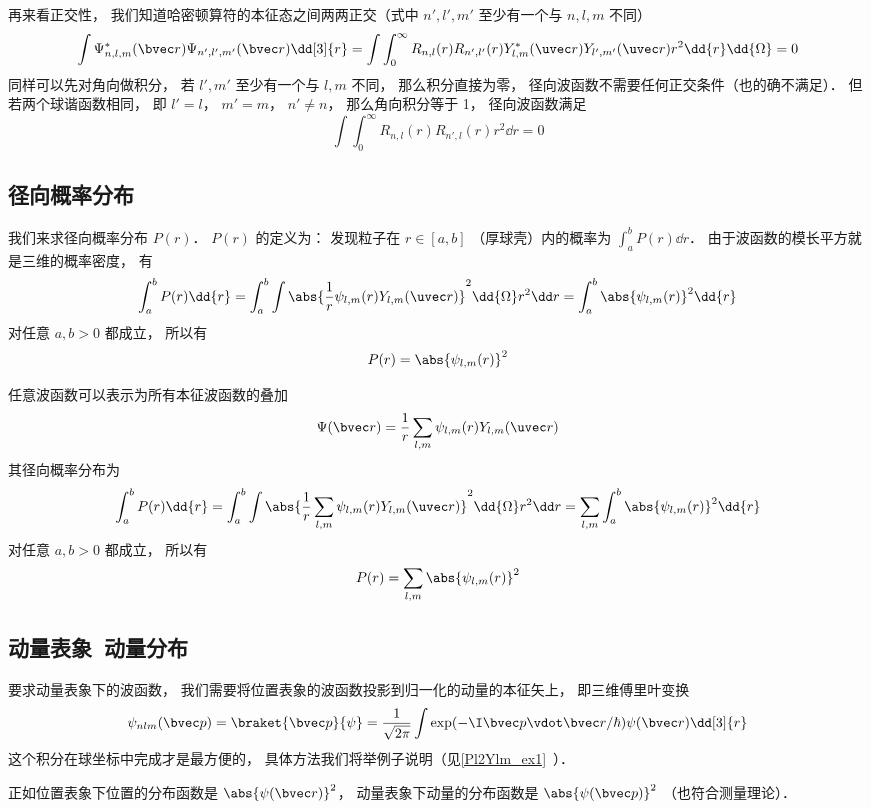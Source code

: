 再来看正交性， 我们知道哈密顿算符的本征态之间两两正交（式中 $n',l',m'$ 至少有一个与 $n, l, m$ 不同）
\begin{equation}
\int \Psi_{n,l,m}^*(\bvec r) \Psi_{n',l',m'}(\bvec r) \dd[3]{r}
= \int \int_0^\infty R_{n,l}(r) R_{n',l'}(r) Y_{l,m}^*(\uvec r)  Y_{l',m'}(\uvec r) r^2 \dd{r}\dd{\Omega} = 0
\end{equation}
同样可以先对角向做积分， 若 $l',m'$ 至少有一个与 $l, m$ 不同， 那么积分直接为零， 径向波函数不需要任何正交条件（也的确不满足）． 但若两个球谐函数相同， 即 $l' = l$， $m' = m$， $n' \ne n$， 那么角向积分等于 1， 径向波函数满足
\begin{equation}
\int \int_0^\infty R_{n,l}(r) R_{n',l}(r) r^2 \dd{r} = 0
\end{equation}

\subsection{径向概率分布}
我们来求径向概率分布 $P(r)$． $P(r)$ 的定义为： 发现粒子在 $r \in [a, b]$ （厚球壳）内的概率为 $\int_a^b P(r) \dd{r}$． 由于波函数的模长平方就是三维的概率密度， 有
\begin{equation}
\int_a^b P(r) \dd{r} = \int_a^b \int \abs{\frac1r \psi_{l,m}(r) Y_{l,m}(\uvec r)}^2 \dd{\Omega} r^2 \dd r
= \int_a^b \abs{\psi_{l,m}(r)}^2 \dd{r}
\end{equation}
对任意 $a, b > 0$ 都成立， 所以有
\begin{equation}
P(r) = \abs{\psi_{l,m}(r)}^2
\end{equation}

任意波函数可以表示为所有本征波函数的叠加
\begin{equation}
\Psi(\bvec r) = \frac1r \sum_{l,m} \psi_{l,m}(r) Y_{l,m}(\uvec r)
\end{equation}
其径向概率分布为
\begin{equation}\label{HWF_eq4}
\int_a^b P(r) \dd{r} = \int_a^b \int \abs{\frac1r \sum_{l,m}\psi_{l,m}(r) Y_{l,m}(\uvec r)}^2 \dd{\Omega} r^2 \dd r
= \sum_{l,m} \int_a^b \abs{\psi_{l,m}(r)}^2 \dd{r}
\end{equation}
对任意 $a, b > 0$ 都成立， 所以有
\begin{equation}
P(r) = \sum_{l,m} \abs{\psi_{l,m}(r)}^2
\end{equation}

\subsection{动量表象\ 动量分布}
要求动量表象下的波函数， 我们需要将位置表象的波函数投影到归一化的动量的本征矢上， 即三维傅里叶变换
\begin{equation}
\psi_{nlm}(\bvec p) = \braket{\bvec p}{\psi} = \frac{1}{\sqrt{2\pi}} \int \exp(-\I \bvec p \vdot \bvec r/\hbar) \psi(\bvec r) \dd[3]{r}
\end{equation}
这个积分在球坐标中完成才是最方便的， 具体方法我们将举例子说明（见\autoref{Pl2Ylm_ex1}~）．

正如位置表象下位置的分布函数是 $\abs{\psi(\bvec r)}^2$， 动量表象下动量的分布函数是 $\abs{\psi(\bvec p)}^2$ （也符合测量理论）．
